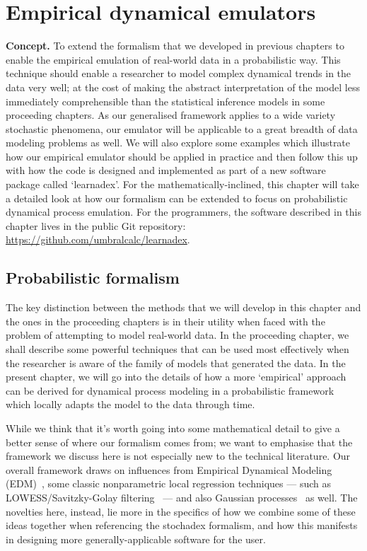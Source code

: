 \chapter{\sffamily Empirical dynamical emulators}

{\bfseries\sffamily Concept.} To extend the formalism that we developed in previous chapters to enable the empirical emulation of real-world data in a probabilistic way. This technique should enable a researcher to model complex dynamical trends in the data very well; at the cost of making the abstract interpretation of the model less immediately comprehensible than the statistical inference models in some proceeding chapters. As our generalised framework applies to a wide variety stochastic phenomena, our emulator will be applicable to a great breadth of data modeling problems as well. We will also explore some examples which illustrate how our empirical emulator should be applied in practice and then follow this up with how the code is designed and implemented as part of a new software package called `learnadex'. For the mathematically-inclined, this chapter will take a detailed look at how our formalism can be extended to focus on probabilistic dynamical process emulation. For the programmers, the software described in this chapter lives in the public Git repository: \href{https://github.com/umbralcalc/learnadex}{https://github.com/umbralcalc/learnadex}.

\section{\sffamily Probabilistic formalism}

The key distinction between the methods that we will develop in this chapter and the ones in the proceeding chapters is in their utility when faced with the problem of attempting to model real-world data. In the proceeding chapter, we shall describe some powerful techniques that can be used most effectively when the researcher is aware of the family of models that generated the data. In the present chapter, we will go into the details of how a more `empirical' approach can be derived for dynamical process modeling in a probabilistic framework which locally adapts the model to the data through time. 

While we think that it's worth going into some mathematical detail to give a better sense of where our formalism comes from; we want to emphasise that the framework we discuss here is not especially new to the technical literature. Our overall framework draws on influences from Empirical Dynamical Modeling (EDM)~\cite{sugihara1990nonlinear}, some classic nonparametric local regression techniques --- such as LOWESS/Savitzky-Golay filtering~\cite{savitzky1964smoothing} --- and also Gaussian processes~\cite{murphy2012machine} as well. The novelties here, instead, lie more in the specifics of how we combine some of these ideas together when referencing the stochadex formalism, and how this manifests in designing more generally-applicable software for the user.

